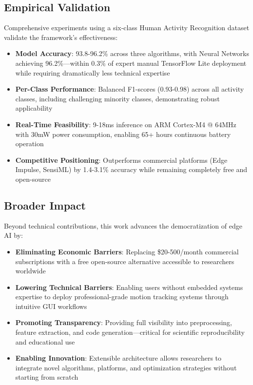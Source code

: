 \subsection{Empirical Validation}
Comprehensive experiments using a six-class Human Activity Recognition dataset validate the framework's effectiveness:
\begin{itemize}
    \item \textbf{Model Accuracy}: 93.8-96.2\% across three algorithms, with Neural Networks achieving 96.2\%—within 0.3\% of expert manual TensorFlow Lite deployment while requiring dramatically less technical expertise
    \item \textbf{Per-Class Performance}: Balanced F1-scores (0.93-0.98) across all activity classes, including challenging minority classes, demonstrating robust applicability
    \item \textbf{Real-Time Feasibility}: 9-18ms inference on ARM Cortex-M4 @ 64MHz with 30mW power consumption, enabling 65+ hours continuous battery operation
    \item \textbf{Competitive Positioning}: Outperforms commercial platforms (Edge Impulse, SensiML) by 1.4-3.1\% accuracy while remaining completely free and open-source
\end{itemize}

\subsection{Broader Impact}
Beyond technical contributions, this work advances the democratization of edge AI by:
\begin{itemize}
    \item \textbf{Eliminating Economic Barriers}: Replacing \$20-500/month commercial subscriptions with a free open-source alternative accessible to researchers worldwide
    \item \textbf{Lowering Technical Barriers}: Enabling users without embedded systems expertise to deploy professional-grade motion tracking systems through intuitive GUI workflows
    \item \textbf{Promoting Transparency}: Providing full visibility into preprocessing, feature extraction, and code generation—critical for scientific reproducibility and educational use
    \item \textbf{Enabling Innovation}: Extensible architecture allows researchers to integrate novel algorithms, platforms, and optimization strategies without starting from scratch
\end{itemize}

